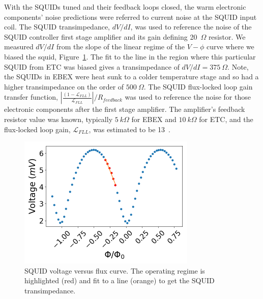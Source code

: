 With the \ac{SQUID}s tuned and their feedback loops closed, the warm electronic components' noise predictions were referred to current noise at the \ac{SQUID} input coil.
The \ac{SQUID} transimpedance, $dV/dI$, was used to reference the noise of the \ac{SQUID} controller first stage amplifier and its gain defining 20~$\Omega$ resistor. 
We measured $dV/dI$ from the slope of the linear regime of the $V-\phi$ curve where we biased the squid, Figure~\ref{fig:squid_transimpedance}. 
The fit to the line in the region where this particular \ac{SQUID} from \ac{ETC} was biased gives a transimpedance of $dV/dI=375~\Omega$. 
Note, the \ac{SQUID}s in \ac{EBEX} were heat sunk to a colder temperature stage and so had a higher transimpedance on the order of $500~\Omega$. 
The \ac{SQUID} flux-locked loop gain transfer function, $|\frac{(1-\mathscr{L}_{FLL})}{\mathscr{L}_{FLL}}|/R_{feedback}$ was used to reference the noise for those electronic components after the first stage amplifier. 
The amplifier's feedback resistor value was known, typically $5~k\Omega$ for \ac{EBEX} and $10~k\Omega$ for \ac{ETC}, and the flux-locked loop gain, $\mathscr{L}_{FLL}$, was estimated to be 13~\cite{Hubmayr2009}.

\begin{figure}[ht!]
\begin{center}
\includegraphics[height=2.5in]{figures/vphi_physical.png}
\caption{\ac{SQUID} voltage versus flux curve. The operating regime is highlighted (red) and fit to a line (orange) to get the \ac{SQUID} transimpedance.
\label{fig:squid_transimpedance} }
\end{center}
\end{figure}

